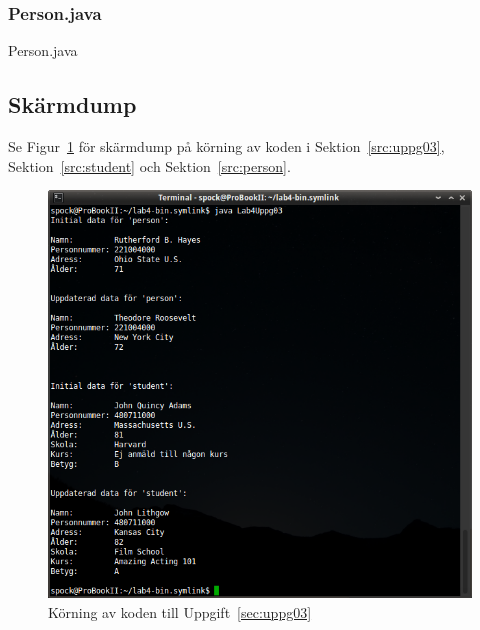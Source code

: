 \subsubsection{Person.java}
\caption{Person.java}
\label{src:person}


\subsection{Skärmdump}
Se Figur~\ref{fig:uppg03-screenshot} för skärmdump på körning av koden i
Sektion~\ref{src:uppg03}, Sektion~\ref{src:student} och
Sektion~\ref{src:person}.

\begin{figure}[htbp]
\centering
\includegraphics[width=\linewidth]{img/03.png}
\caption{Körning av koden till Uppgift~\ref{sec:uppg03}}
\label{fig:uppg03-screenshot}
\end{figure}

